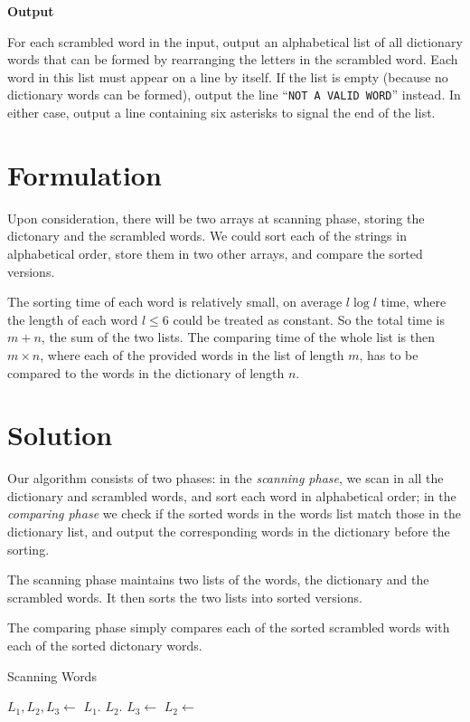 \documentclass[12pt]{article}
\begin{document}
\bigskip

\noindent\textbf{Output}

For each scrambled word in the input, output an alphabetical list of all dictionary words that can be formed by rearranging the letters in the scrambled word. Each word in this list must appear on a line by itself. If the list is empty (because no dictionary words can be formed), output the line ``\texttt{NOT A VALID WORD}'' instead. In either case, output a line containing six asterisks to signal the end of the list.


\newpage

\section{Formulation}
Upon consideration, there will be two arrays at scanning phase, storing the dictonary and the scrambled words. We could sort each of the strings in alphabetical order, store them in two other arrays, and compare the sorted versions.

The sorting time of each word is relatively small, on average $l\log l$ time, where the length of each word $l\leq6$ could be treated as constant. So the total time is $m+n$, the sum of the two lists. The comparing time of the whole list is then $m\times n$, where each of the provided words in the list of length $m$, has to be compared to the words in the dictionary of length $n$.

\section{Solution}

Our algorithm consists of two phases: in the \textit{scanning phase}, we scan in all the dictionary and scrambled words, and sort each word in alphabetical order; in the \textit{comparing phase} we check if the sorted words in the words list match those in the dictionary list, and output the corresponding words in the dictionary before the sorting.

The scanning phase maintains two lists of the words, the dictionary and the scrambled words. It then sorts the two lists into sorted versions.

The comparing phase simply compares each of the sorted scrambled words with each of the sorted dictonary words.

\begin{algorithm}[H]
  \caption{Scanning Words}
  \begin{algorithmic}
      \State $L_1,L_2,L_3 \gets$ 
          \State $L_1$.
      \EndWhile
          \State $L_2$.
      \EndWhile
      \State $L_3 \gets$ 
      \State $L_2 \gets$ 
    \EndProcedure
  \end{algorithmic}
\end{algorithm}
\end{document}
